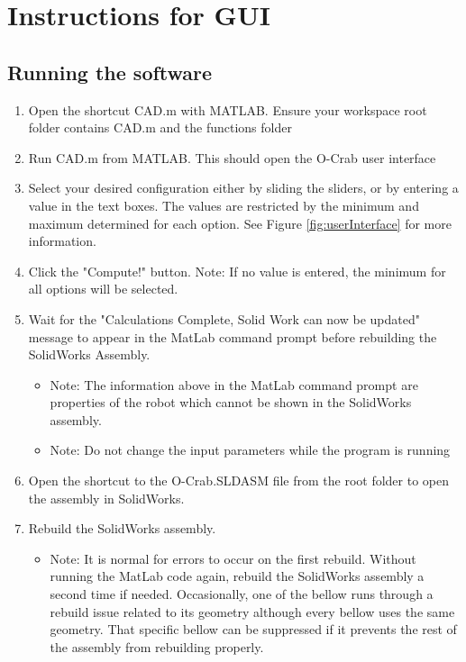 \section{Instructions for GUI} \label{app_sec:instructions}
\subsection{Running the software}
\begin{enumerate}
   \item Open the shortcut CAD.m with MATLAB. Ensure your workspace root folder contains CAD.m and the functions folder
   \item Run CAD.m from MATLAB. This should open the O-Crab user interface
   \item Select your desired configuration either by sliding the sliders, or by entering a value in the text boxes. The values are restricted by the minimum and maximum determined for each option. See Figure \ref{fig:userInterface} for more information.
   \item Click the "Compute!" button. Note: If no value is entered, the minimum for all options will be selected.
   \item Wait for the  "Calculations Complete, Solid Work can now be updated" message to appear in the MatLab command prompt before rebuilding the SolidWorks Assembly.
        \begin{itemize}
            \item Note: The information above in the MatLab command prompt are properties of the robot which cannot be shown in the SolidWorks assembly.
        \end{itemize}
        \begin{itemize}
            \item Note: Do not change the input parameters while the program is running
        \end{itemize}
        \item Open the shortcut to the O-Crab.SLDASM file from the root folder to open the assembly in SolidWorks.
   \item Rebuild the SolidWorks assembly. 
       \begin{itemize}
            \item Note: It is normal for errors to occur on the first rebuild. Without running the MatLab code again, rebuild the SolidWorks assembly a second time if needed. Occasionally, one of the bellow runs through a rebuild issue related to its geometry although every bellow uses the same geometry. That specific bellow can be suppressed if it prevents the rest of the assembly from rebuilding properly.

\end{itemize}
\end{enumerate}
